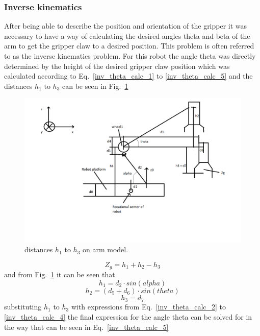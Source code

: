\subsubsection{Inverse kinematics}
After being able to describe the position and orientation of the gripper it was necessary to have a way of calculating the desired angles theta and beta of the arm to get the gripper claw to a desired position. This problem is often referred to as the inverse kinematics problem. For this robot the angle theta was directly determined by the height of the desired gripper claw position which was calculated according to Eq.~\eqref{inv_theta_calc_1} to \ref{inv_theta_calc_5} and the distances \(h_1\) to \(h_3\) can be seen in Fig.~\ref{inv_theta_img}
\begin{figure}[h]
    \centering
    \includegraphics[width=\textwidth]{sections/assets/Arm_model_inv_theta.png}
    \caption{distances \(h_1\) to \(h_3\) on arm model.}
    \label{inv_theta_img}
\end{figure}
\begin{equation}
    Z_g = h_1+h_2 - h_3
    \label{inv_theta_calc_1}
\end{equation}
and from Fig.~\ref{inv_theta_img} it can be seen that
\begin{equation}
    h_1 = d_2 \cdot sin(alpha)
    \label{inv_theta_calc_2}
\end{equation}
\begin{equation}
    h_2 = (d_5 + d_6) \cdot sin(theta)
    \label{inv_theta_calc_3}
\end{equation}
\begin{equation}
    h_3 = d_7
    \label{inv_theta_calc_4}
\end{equation}
substituting \(h_1\) to \(h_3\) with expressions from Eq.~\eqref{inv_theta_calc_2} to \eqref{inv_theta_calc_4} the final expression for the angle theta can be solved for in the way that can be seen in Eq.~\eqref{inv_theta_calc_5}
